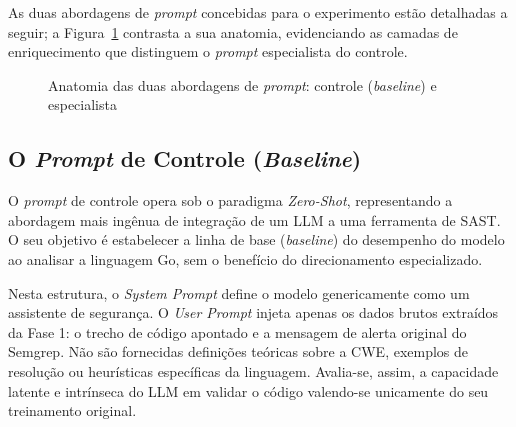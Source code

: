As duas abordagens de \textit{prompt} concebidas para o experimento estão detalhadas a
seguir; a Figura~\ref{fig:prompt} contrasta a sua anatomia, evidenciando as camadas de
enriquecimento que distinguem o \textit{prompt} especialista do controle.

\begin{figure}[htpb]
    \centering
    \caption{Anatomia das duas abordagens de \textit{prompt}: controle (\textit{baseline}) e especialista}
    \label{fig:prompt}
    \fonteautores
\end{figure}

\subsection{O \textit{Prompt} de Controle (\textit{Baseline})}
O \textit{prompt} de controle opera sob o paradigma \textit{Zero-Shot}, representando a abordagem mais ingênua de integração de um LLM a uma ferramenta de SAST. O seu objetivo é estabelecer a linha de base (\textit{baseline}) do desempenho do modelo ao analisar a linguagem Go, sem o benefício do direcionamento especializado.

Nesta estrutura, o \textit{System Prompt} define o modelo genericamente como um assistente de segurança. O \textit{User Prompt} injeta apenas os dados brutos extraídos da Fase 1: o trecho de código apontado e a mensagem de alerta original do Semgrep. Não são fornecidas definições teóricas sobre a CWE, exemplos de resolução ou heurísticas específicas da linguagem. Avalia-se, assim, a capacidade latente e intrínseca do LLM em validar o código valendo-se unicamente do seu treinamento original.

